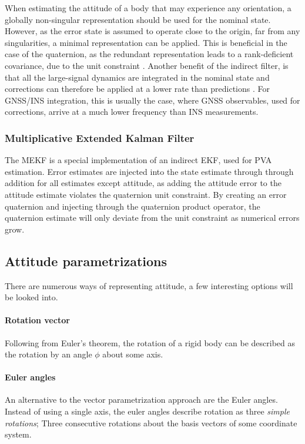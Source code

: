     When estimating the attitude of a body that may experience any orientation, a globally non-singular representation should be used for the nominal state. However, as the error state is assumed to operate close to the origin, far from any singularities, a minimal representation can be applied. This is beneficial in the case of the quaternion, as the redundant representation leads to a rank-deficient covariance, due to the unit constraint \cite{markley2003attitude}. Another benefit of the indirect filter, is that all the large-signal dynamics are integrated in the nominal state and corrections can therefore be applied at a lower rate than predictions \cite{sola2017quaternion}. For GNSS/INS integration, this is usually the case, where GNSS observables, used for corrections, arrive at a much lower frequency than INS measurements.
    
    \subsubsection{Multiplicative Extended Kalman Filter}
    The MEKF is a special implementation of an indirect EKF, used for PVA estimation. Error estimates are injected into the state estimate through through addition for all estimates except attitude, as adding the attitude error to the attitude estimate violates the quaternion unit constraint. By creating an error quaternion and injecting through the quaternion product operator, the quaternion estimate will only deviate from the unit constraint as numerical errors grow.

\subsection{Attitude parametrizations}
There are numerous ways of representing attitude, a few interesting options will be looked into. 

    \paragraph{Rotation vector}
    Following from Euler's theorem, the rotation of a rigid body can be described as the rotation by an angle $\phi$ about some axis. 

    \paragraph{Euler angles}
    An alternative to the vector parametrization approach are the Euler angles. Instead of using a single axis, the euler angles describe rotation as three \textit{simple rotations}; Three consecutive rotations about the basis vectors of some coordinate system. 

